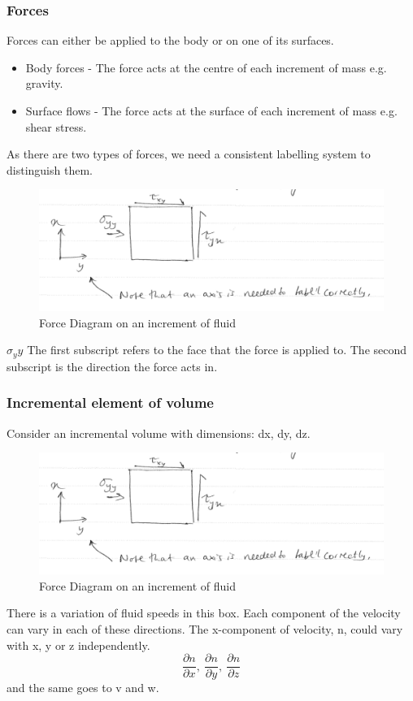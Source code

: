\documentclass[class=report, crop=false, 12pt,a4paper]{standalone}
\begin{document}
\subsubsection{Forces}
Forces can either be applied to the body or on one of its surfaces.
\begin{itemize}[noitemsep]
  \item Body forces - The force acts at the centre of each increment of mass e.g. gravity.
  \item Surface flows - The force acts at the surface of each increment of mass e.g. shear stress.
\end{itemize}
As there are two types of forces, we need a consistent labelling system to distinguish them. 
\begin{figure}[H]
  \centering
  \includegraphics[width = \textwidth]{../img/ForceDiagramFluids}
  \caption{Force Diagram on an increment of fluid}
\end{figure}
\( \sigma_yy \) The first subscript refers to the face that the force is applied to. The second subscript is the direction the force acts in.
\subsubsection{Incremental element of volume}
Consider an incremental volume with dimensions: dx, dy, dz.
\begin{figure}[H]
  \centering
  \includegraphics[width = \textwidth]{../img/ForceDiagramFluids}
  \caption{Force Diagram on an increment of fluid}
\end{figure}
There is a variation of fluid speeds in this box. Each component of the velocity can vary in each of these directions. The x-component of velocity, n, could vary with x, y or z independently.
\begin{equation} 
  \frac{\partial n}{\partial x}, \ \frac{\partial n}{\partial y}, \ \frac{\partial n}{\partial z} 
\end{equation}
and the same goes to v and w.
\end{document}
